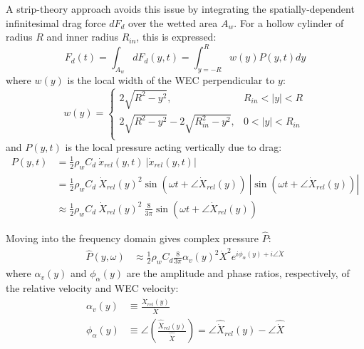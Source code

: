 A strip-theory approach avoids this issue by integrating the spatially-dependent infinitesimal drag force $dF_d$ over the wetted area $A_w$.
For a hollow cylinder of radius $R$ and inner radius $R_{in}$, this is expressed: 
\begin{equation}\label{eq:drag-force-integral}
    F_d(t) = \int_{A_w} dF_d(y,t) = \int_{y=-R}^{R} w(y) P(y,t)dy
\end{equation}
where $w(y)$ is the local width of the WEC perpendicular to $y$:
\begin{equation}\label{eq:drag-width}
    w(y) = \begin{cases}
        2\sqrt{R^2-y^2}, & R_{in}<|y|<R \\
         2\sqrt{R^2-y^2}-2\sqrt{R_{in}^2-y^2}, &0<|y|< R_{in} \\
    \end{cases}
\end{equation}
and $P(y,t)$ is the local pressure acting vertically due to drag:
\begin{equation}\label{eq:drag-pressure}
    \begin{aligned}
    P(y,t) &= \frac{1}{2} \rho_w C_d ~\dot{x}_{rel}(y,t) ~|\dot{x}_{rel}(y,t)| \\
   &=  \frac{1}{2} \rho_w C_d ~\dot{X}_{rel}(y)^2 \sin(\omega t+\angle \dot{X}_{rel}(y)) ~\left| \sin(\omega t+\angle \dot{X}_{rel}(y))\right| \\
   &\approx  \frac{1}{2} \rho_w C_d ~\dot{X}_{rel}(y) ^2~\frac{8}{3\pi}\sin(\omega t+\angle \dot{X}_{rel}(y)) 
    \end{aligned}
\end{equation}

Moving into the frequency domain gives complex pressure $\hat{P}$:
\begin{equation}
\begin{aligned}
 \hat{P}(y,\omega)  &\approx \frac{1}{2} \rho_w C_d \frac{8}{3\pi}\alpha_v(y)^2 \dot{X}^2 e^{i\phi_\alpha(y)+i\angle\dot{X}}
    \end{aligned}
\end{equation}
where $\alpha_v(y)$ and $\phi_\alpha(y)$ are the amplitude and phase ratios, respectively, of the relative velocity and WEC velocity:
\begin{equation}\label{eq:drag-alpha-definitions}
\begin{aligned}
    \alpha_v(y) &\equiv \frac{\dot{X}_{rel}(y)}{\dot{X}} \\
    \phi_\alpha(y) &\equiv \angle
    \left(
        \frac{\hat{\dot{X}}_{rel}(y)}
            {\hat{\dot{X}}}
    \right)   
    = \angle\hat{\dot{X}}_{rel}(y) -  \angle\hat{\dot{X}} 
\end{aligned}
\end{equation}

